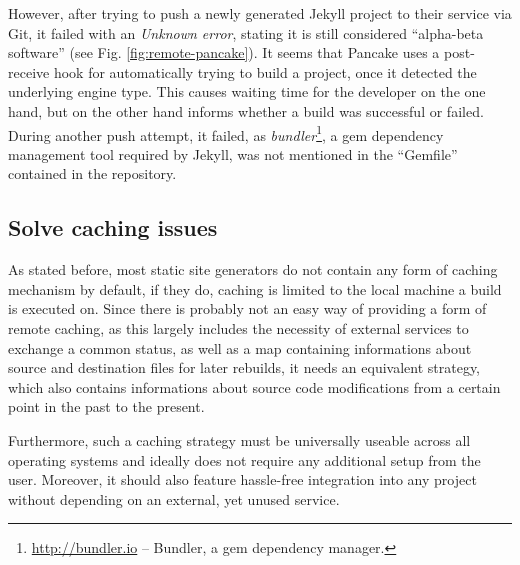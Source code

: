 However, after trying to push a newly generated Jekyll project to their service via Git, it failed with an \emph{Unknown error}, stating it is still considered ``alpha-beta software'' (see Fig. \ref{fig:remote-pancake}). It seems that Pancake uses a post-receive hook for automatically trying to build a project, once it detected the underlying engine type. This causes waiting time for the developer on the one hand, but on the other hand informs whether a build was successful or failed. During another push attempt, it failed, as \emph{bundler}\footnote{\url{http://bundler.io} -- Bundler, a gem dependency manager.}, a gem dependency management tool required by Jekyll, was not mentioned in the ``Gemfile'' contained in the repository.


\subsection{Solve caching issues}
\label{sec:solutions-caching}

As stated before, most static site generators do not contain any form of caching mechanism by default, if they do, caching is limited to the local machine a build is executed on. Since there is probably not an easy way of providing a form of remote caching, as this largely includes the necessity of external services to exchange a common status, as well as a map containing informations about source and destination files for later rebuilds, it needs an equivalent strategy, which also contains informations about source code modifications from a certain point in the past to the present.

Furthermore, such a caching strategy must be universally useable across all operating systems and ideally does not require any additional setup from the user. Moreover, it should also feature hassle-free integration into any project without depending on an external, yet unused service.
